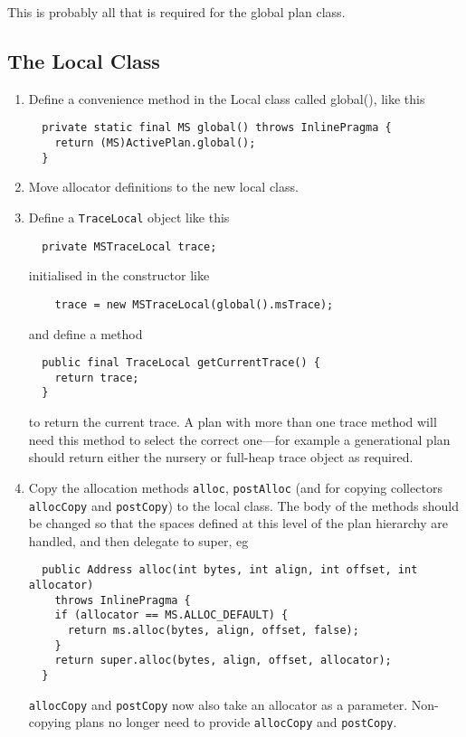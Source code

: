 \documentclass[10pt]{article}
\newcommand{\code}[1]{\lstinline!#1!}
\begin{document}
This is probably all that is required for the global plan class.

\subsection{The Local Class}
\begin{enumerate}
\item Define a convenience method in the Local class called global(),
  like this
\begin{lstlisting}
  private static final MS global() throws InlinePragma {
    return (MS)ActivePlan.global();
  }
\end{lstlisting}


\item Move allocator definitions to the new local class.

\item Define a \code{TraceLocal} object like this
\begin{lstlisting}
  private MSTraceLocal trace;
\end{lstlisting}
initialised in the constructor like
\begin{lstlisting}
    trace = new MSTraceLocal(global().msTrace);
\end{lstlisting}
and define a method
\begin{lstlisting}
  public final TraceLocal getCurrentTrace() {
    return trace;
  }
\end{lstlisting}
to return the current trace.  A plan with more than one trace method
will need this method to select the correct one---for example a
generational plan should return either the nursery or full-heap trace
object as required.

\item Copy the allocation methods \code{alloc}, \code{postAlloc} (and
  for copying collectors 
  \code{allocCopy} and \code{postCopy}) to the local class.  The body
  of the methods should be changed so that the spaces defined at this
  level of the plan hierarchy are handled, and then delegate to
  super, eg
\begin{lstlisting}
  public Address alloc(int bytes, int align, int offset, int allocator)
    throws InlinePragma {
    if (allocator == MS.ALLOC_DEFAULT) {
      return ms.alloc(bytes, align, offset, false);
    }
    return super.alloc(bytes, align, offset, allocator);
  }
\end{lstlisting}

  \code{allocCopy} and \code{postCopy} now also take an allocator
  as a parameter.  Non-copying plans no longer need to provide 
  \code{allocCopy} and \code{postCopy}.


\end{enumerate}
\end{document}
